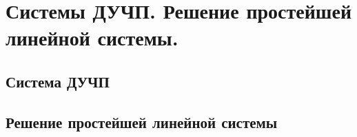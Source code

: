 \chapter{Системы ДУЧП. Решение простейшей линейной системы.}

\section{Система ДУЧП}
\section{Решение простейшей линейной системы}

\newpage
